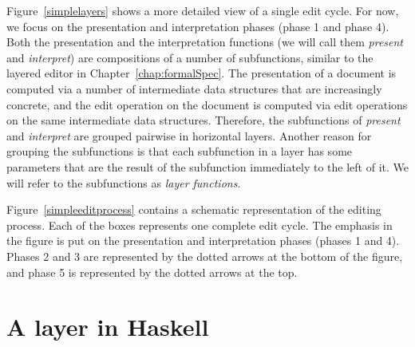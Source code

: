 \bc {}

Figure~\ref{simplelayers}  shows a more detailed view of a single edit cycle. For now, we focus on the presentation and interpretation phases (phase 1 and phase 4). Both the presentation and the interpretation functions (we will call them {\em present} and {\em interpret}) are compositions of a number of subfunctions, similar to the layered editor in Chapter~\ref{chap:formalSpec}. The presentation of a document is computed via a number of intermediate data structures that are increasingly concrete, and the edit operation on the document is computed via edit operations on the same intermediate data structures. Therefore, the subfunctions of {\em present} and {\em interpret} are grouped pairwise in horizontal layers. Another reason for grouping the subfunctions is that each subfunction in a layer has some parameters that are the result of the subfunction immediately to the left of it. We will refer to the subfunctions as {\em layer functions}. \ec


% 



\bc
Figure~\ref{simpleeditprocess} contains a schematic representation of the editing process. Each of the boxes represents one complete edit cycle. The emphasis in the figure is put on the presentation and interpretation phases (phases 1 and 4). Phases 2 and 3 are represented by the dotted arrows at the bottom of the figure, and phase 5 is represented by the dotted arrows at the top.
\ec



%																
%																
%																
\section{A layer in Haskell} \label{sect:layerInHaskell}

